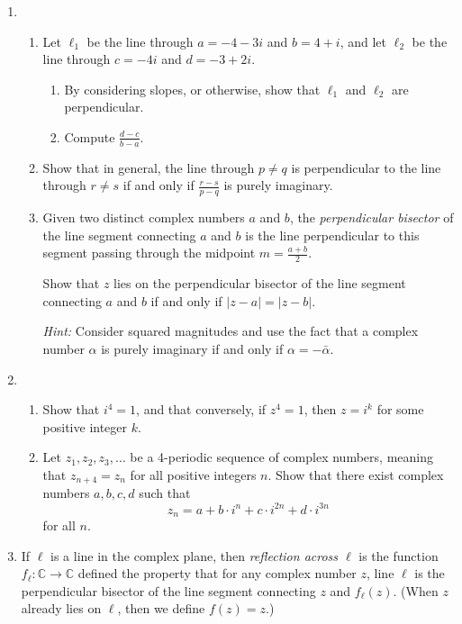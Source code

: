 \begin{enumerate}
\begin{enumerate}
\end{enumerate}
\item \begin{enumerate}
\item Let $\ell_1$ be the line through $a = -4 - 3i$ and $b = 4 + i$, and let $\ell_2$ be the line through $c = -4i$ and $d = -3 + 2i$.
\begin{enumerate}
\item By considering slopes, or otherwise, show that $\ell_1$ and $\ell_2$ are perpendicular.
\item Compute $\frac{d - c}{b - a}$.
\end{enumerate}
\item Show that in general, the line through $p\neq q$ is perpendicular to the line through $r\neq s$ if and only if $\frac{r - s}{p - q}$ is purely imaginary.
\item Given two distinct complex numbers $a$ and $b$, the \emph{perpendicular bisector} of the line segment connecting $a$ and $b$ is the line perpendicular to this segment passing through the midpoint $m = \frac{a + b}{2}$.\par
Show that $z$ lies on the perpendicular bisector of the line segment connecting $a$ and $b$ if and only if $\lvert z - a\rvert = \lvert z - b\rvert$.\par
\emph{Hint:} Consider squared magnitudes and use the fact that a complex number $\alpha$ is purely imaginary if and only if $\alpha = -\bar{\alpha}$.
\end{enumerate}
\item \begin{enumerate}
\item Show that $i^4 = 1$, and that conversely, if $z^4 = 1$, then $z = i^k$ for some positive integer $k$.
\item Let $z_1, z_2, z_3, \ldots$ be a 4-periodic sequence of complex numbers, meaning that $z_{n + 4} = z_n$ for all positive integers $n$. Show that there exist complex numbers $a,b,c,d$ such that
\begin{equation*}
z_n = a + b\cdot i^n + c\cdot i^{2n} + d\cdot i^{3n}
\end{equation*}
for all $n$.
\end{enumerate}
\item If $\ell$ is a line in the complex plane, then \emph{reflection across $\ell$} is the function $f_{\ell}:\mathbb{C}\to\mathbb{C}$ defined the property that for any complex number $z$, line $\ell$ is the perpendicular bisector of the line segment connecting $z$ and $f_{\ell}(z)$. (When $z$ already lies on $\ell$, then we define $f(z) = z$.)

\end{enumerate}
